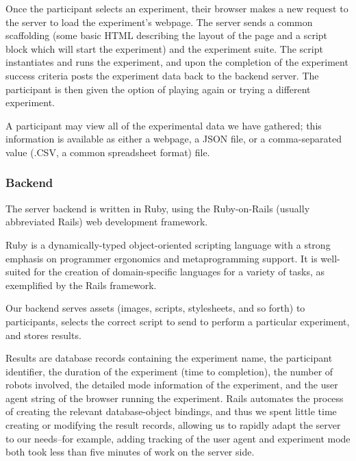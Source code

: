 Once the participant selects an experiment, their browser makes a new request to the server to load the experiment's webpage. The server sends a common scaffolding (some basic HTML describing the layout of the page and a script block which will start the experiment) and the experiment suite. The script instantiates and runs the experiment, and upon the completion of the experiment success criteria posts the experiment data back to the backend server. The participant is then given the option of playing again or trying a different experiment.

A participant may view all of the experimental data we have gathered; this information is available as either a webpage, a JSON file, or a comma-separated value (.CSV, a common spreadsheet format) file.

\subsubsection{Backend}

The server backend is written in Ruby, using the Ruby-on-Rails (usually abbreviated Rails) web development framework.

Ruby is a dynamically-typed object-oriented scripting language with a strong emphasis on programmer ergonomics and metaprogramming support. It is well-suited for the creation of domain-specific languages for a variety of tasks, as exemplified by the Rails framework.


Our backend serves assets (images, scripts, stylesheets, and so forth) to participants, selects the correct script to send to perform a particular experiment, and stores results.

Results are database records containing the experiment name, the participant identifier, the duration of the experiment (time to completion), the number of robots involved, the detailed mode information of the experiment, and the user agent string of the browser running the experiment. Rails automates the process of creating the relevant database-object bindings, and thus we spent little time creating or modifying the result records, allowing us to rapidly adapt the server to our needs--for example, adding tracking of the user agent and experiment mode both took less than five minutes of work on the server side.

